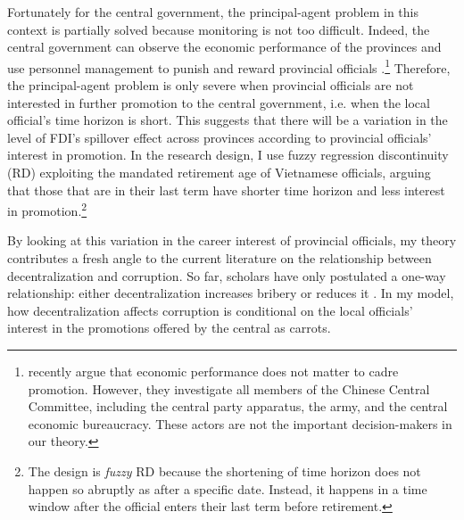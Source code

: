 Fortunately for the central government, the principal-agent problem in this context is partially solved because monitoring is not too difficult. Indeed, the central government can observe the economic performance of the provinces and use personnel management to punish and reward provincial officials \citep{Sheng2007, Li2005}.\footnote{\citet{Shih2012} recently argue that economic performance does not matter to cadre promotion. However, they investigate all members of the Chinese Central Committee, including the central party apparatus, the army, and the central economic bureaucracy. These actors are not the important decision-makers in our theory.} Therefore, the principal-agent problem is only severe when provincial officials are not interested in further promotion to the central government, i.e. when the local official's time horizon is short. This suggests that there will be a variation in the level of FDI's spillover effect across provinces according to provincial officials' interest in promotion. In the research design, I use fuzzy regression discontinuity (RD) exploiting the mandated retirement age of Vietnamese officials, arguing that those that are in their last term have shorter time horizon and less interest in promotion.\footnote{The design is \textit{fuzzy} RD because the shortening of time horizon does not happen so abruptly as after a specific date. Instead, it happens in a time window after the official enters their last term before retirement.}

By looking at this variation in the career interest of provincial officials, my theory contributes a fresh angle to the current literature on the relationship between decentralization and corruption. So far, scholars have only postulated a one-way relationship: either decentralization increases bribery \citep{Fan2009} or reduces it \citep{Guerra2009}. In my model, how decentralization affects corruption is conditional on the local officials' interest in the promotions offered by the central as carrots.


